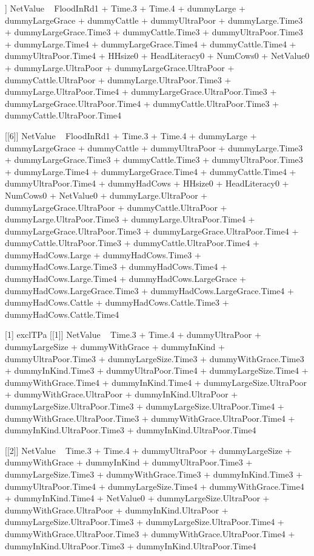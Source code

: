 \begin{Schunk}
\begin{Soutput}
[[5]]
NetValue ~ FloodInRd1 + Time.3 + Time.4 + dummyLarge + dummyLargeGrace + 
    dummyCattle + dummyUltraPoor + dummyLarge.Time3 + dummyLargeGrace.Time3 + 
    dummyCattle.Time3 + dummyUltraPoor.Time3 + dummyLarge.Time4 + 
    dummyLargeGrace.Time4 + dummyCattle.Time4 + dummyUltraPoor.Time4 + 
    HHsize0 + HeadLiteracy0 + NumCows0 + NetValue0 + dummyLarge.UltraPoor + 
    dummyLargeGrace.UltraPoor + dummyCattle.UltraPoor + dummyLarge.UltraPoor.Time3 + 
    dummyLarge.UltraPoor.Time4 + dummyLargeGrace.UltraPoor.Time3 + 
    dummyLargeGrace.UltraPoor.Time4 + dummyCattle.UltraPoor.Time3 + 
    dummyCattle.UltraPoor.Time4

[[6]]
NetValue ~ FloodInRd1 + Time.3 + Time.4 + dummyLarge + dummyLargeGrace + 
    dummyCattle + dummyUltraPoor + dummyLarge.Time3 + dummyLargeGrace.Time3 + 
    dummyCattle.Time3 + dummyUltraPoor.Time3 + dummyLarge.Time4 + 
    dummyLargeGrace.Time4 + dummyCattle.Time4 + dummyUltraPoor.Time4 + 
    dummyHadCows + HHsize0 + HeadLiteracy0 + NumCows0 + NetValue0 + 
    dummyLarge.UltraPoor + dummyLargeGrace.UltraPoor + dummyCattle.UltraPoor + 
    dummyLarge.UltraPoor.Time3 + dummyLarge.UltraPoor.Time4 + 
    dummyLargeGrace.UltraPoor.Time3 + dummyLargeGrace.UltraPoor.Time4 + 
    dummyCattle.UltraPoor.Time3 + dummyCattle.UltraPoor.Time4 + 
    dummyHadCows.Large + dummyHadCows.Time3 + dummyHadCows.Large.Time3 + 
    dummyHadCows.Time4 + dummyHadCows.Large.Time4 + dummyHadCows.LargeGrace + 
    dummyHadCows.LargeGrace.Time3 + dummyHadCows.LargeGrace.Time4 + 
    dummyHadCows.Cattle + dummyHadCows.Cattle.Time3 + dummyHadCows.Cattle.Time4

[1] exclTPa
[[1]]
NetValue ~ Time.3 + Time.4 + dummyUltraPoor + dummyLargeSize + 
    dummyWithGrace + dummyInKind + dummyUltraPoor.Time3 + dummyLargeSize.Time3 + 
    dummyWithGrace.Time3 + dummyInKind.Time3 + dummyUltraPoor.Time4 + 
    dummyLargeSize.Time4 + dummyWithGrace.Time4 + dummyInKind.Time4 + 
    dummyLargeSize.UltraPoor + dummyWithGrace.UltraPoor + dummyInKind.UltraPoor + 
    dummyLargeSize.UltraPoor.Time3 + dummyLargeSize.UltraPoor.Time4 + 
    dummyWithGrace.UltraPoor.Time3 + dummyWithGrace.UltraPoor.Time4 + 
    dummyInKind.UltraPoor.Time3 + dummyInKind.UltraPoor.Time4

[[2]]
NetValue ~ Time.3 + Time.4 + dummyUltraPoor + dummyLargeSize + 
    dummyWithGrace + dummyInKind + dummyUltraPoor.Time3 + dummyLargeSize.Time3 + 
    dummyWithGrace.Time3 + dummyInKind.Time3 + dummyUltraPoor.Time4 + 
    dummyLargeSize.Time4 + dummyWithGrace.Time4 + dummyInKind.Time4 + 
    NetValue0 + dummyLargeSize.UltraPoor + dummyWithGrace.UltraPoor + 
    dummyInKind.UltraPoor + dummyLargeSize.UltraPoor.Time3 + 
    dummyLargeSize.UltraPoor.Time4 + dummyWithGrace.UltraPoor.Time3 + 
    dummyWithGrace.UltraPoor.Time4 + dummyInKind.UltraPoor.Time3 + 
    dummyInKind.UltraPoor.Time4


\end{Soutput}
\end{Schunk}
